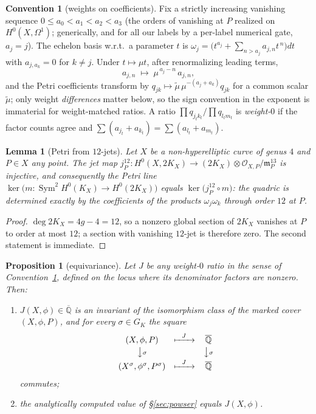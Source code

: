 \documentclass[11pt]{amsart}
\newcommand{\QQ}{\mathbb{Q}}
\newcommand{\GK}{G_{K}}
\newcommand{\Sym}{\operatorname{Sym}}
\theoremstyle{plain}
\newtheorem{lemma}[theorem]{Lemma}
\newtheorem{proposition}[theorem]{Proposition}
\theoremstyle{definition}
\newtheorem{convention}[theorem]{Convention}
\begin{document}
\begin{convention}[weights on coefficients]\label{conv:weights}
Fix a strictly increasing vanishing sequence
$0\le a_0<a_1<a_2<a_3$ (the orders of vanishing at $P$ realized on
$H^0(X,\Omega^1)$; generically, and for all our labels by a per-label
numerical gate, $a_j=j$). The echelon basis w.r.t.\ a parameter $t$
is $\omega_j = \bigl(t^{a_j}+\sum_{n>a_j}a_{j,n}t^{\,n}\bigr)dt$
with $a_{j,a_k}=0$ for $k\neq j$. Under $t\mapsto\mu t$, after
renormalizing leading terms,
\[
  a_{j,n}\;\longmapsto\;\mu^{\,a_j-n}\,a_{j,n},
\]
and the Petri coefficients transform by
$q_{jk}\mapsto \tilde\mu\,\mu^{-(a_j+a_k)}q_{jk}$ for a common
scalar $\tilde\mu$; only weight \emph{differences} matter below, so
the sign convention in the exponent is immaterial for weight-matched
ratios. A ratio $\prod q_{j_tk_t}/\prod q_{l_tm_t}$ is
\emph{weight-$0$} if the factor counts agree and
$\sum(a_{j_t}+a_{k_t})=\sum(a_{l_t}+a_{m_t})$.
\end{convention}

\begin{lemma}[Petri from $12$-jets]\label{lem:jets}
Let $X$ be a non-hyperelliptic curve of genus $4$ and $P\in X$ any
point. The jet map
$j^{12}_P\colon H^0(X,2K_X)\to (2K_X)\otimes
\mathcal{O}_{X,P}/\mathfrak{m}_P^{13}$
is injective, and consequently the Petri line
$\ker\bigl(m\colon\Sym^2H^0(K_X)\to H^0(2K_X)\bigr)$ equals
$\ker\bigl(j^{12}_P\circ m\bigr)$: the quadric is determined exactly
by the coefficients of the products $\omega_j\omega_k$ through order
$12$ at $P$.
\end{lemma}

\begin{proof}
$\deg 2K_X = 4g-4 = 12$, so a nonzero global section of $2K_X$
vanishes at $P$ to order at most $12$; a section with vanishing
$12$-jet is therefore zero. The second statement is immediate.
\end{proof}

\begin{proposition}[equivariance]\label{prop:equivariance}
Let $J$ be any weight-$0$ ratio in the sense of
Convention~\ref{conv:weights}, defined on the locus where its
denominator factors are nonzero. Then:
\begin{enumerate}
\item $J(X,\phi)\in\overline{\QQ}$ is an invariant of the
  isomorphism class of the marked cover $(X,\phi,P)$, and for every
  $\sigma\in\GK$ the square
  \[
  \begin{array}{ccc}
    (X,\phi,P) & \xmapsto{\ \ J\ \ } & \overline{\QQ}\\[2pt]
    \big\downarrow{\scriptstyle\sigma} & & \big\downarrow{\scriptstyle\sigma}\\[2pt]
    (X^\sigma,\phi^\sigma,P^\sigma) & \xmapsto{\ \ J\ \ } & \overline{\QQ}
  \end{array}
  \]
  commutes;
\item the analytically computed value of \S\ref{sec:powser} equals
  $J(X,\phi)$.
\end{enumerate}
\end{proposition}
\end{document}
